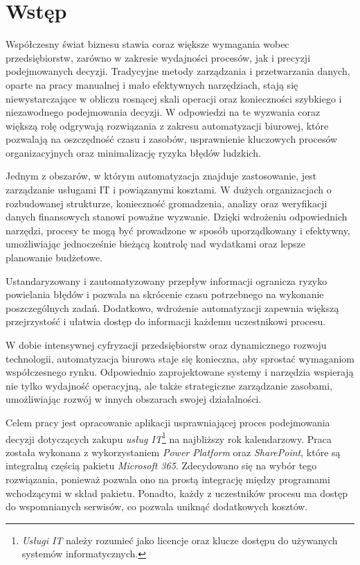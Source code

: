 \chapter{Wstęp}
Współczesny świat biznesu stawia coraz większe wymagania wobec przedsiębiorstw, zarówno w zakresie wydajności procesów, jak i precyzji podejmowanych decyzji. Tradycyjne metody zarządzania i przetwarzania danych, oparte na pracy manualnej i mało efektywnych narzędziach, stają się niewystarczające w obliczu rosnącej skali operacji oraz konieczności szybkiego i niezawodnego podejmowania decyzji. W odpowiedzi na te wyzwania coraz większą rolę odgrywają rozwiązania z zakresu automatyzacji biurowej, które pozwalają na oszczędność czasu i zasobów, usprawnienie kluczowych procesów organizacyjnych oraz minimalizację ryzyka błędów ludzkich.
\par Jednym z obszarów, w którym automatyzacja znajduje zastosowanie, jest zarządzanie usługami IT i powiązanymi kosztami. W dużych organizacjach o rozbudowanej strukturze, konieczność gromadzenia, analizy oraz weryfikacji danych finansowych stanowi poważne wyzwanie. Dzięki wdrożeniu odpowiednich narzędzi, procesy te mogą być prowadzone w sposób uporządkowany i efektywny, umożliwiając jednocześnie bieżącą kontrolę nad wydatkami oraz lepsze planowanie budżetowe.
\par   Ustandaryzowany i zautomatyzowany przepływ informacji ogranicza ryzyko powielania błędów i pozwala na skrócenie czasu potrzebnego na wykonanie poszczególnych zadań. Dodatkowo, wdrożenie automatyzacji zapewnia większą przejrzystość i ułatwia dostęp do informacji każdemu uczestnikowi procesu.
\par W dobie intensywnej cyfryzacji przedsiębiorstw oraz dynamicznego rozwoju technologii, automatyzacja biurowa staje się konieczna, aby sprostać wymaganiom współczesnego rynku. Odpowiednio zaprojektowane systemy i narzędzia wspierają nie tylko wydajność operacyjną, ale także strategiczne zarządzanie zasobami, umożliwiając rozwój w innych obszarach swojej działalności.
\vspace{1cm}
\par Celem pracy jest opracowanie aplikacji usprawniającej proces podejmowania decyzji dotyczących zakupu \emph{usług IT}\footnote{\emph{Usługi IT}  należy rozumieć jako licencje oraz klucze dostępu do używanych systemów informatycznych.} na najbliższy rok kalendarzowy. Praca została wykonana z wykorzystaniem \emph{Power Platform} oraz \emph{SharePoint}, które są integralną częścią pakietu \emph{Microsoft 365}. Zdecydowano się na wybór tego rozwiązania, ponieważ pozwala ono na prostą integrację między programami wchodzącymi w skład pakietu. Ponadto, każdy z uczestników procesu ma dostęp do wspomnianych serwisów, co pozwala uniknąć dodatkowych kosztów.

